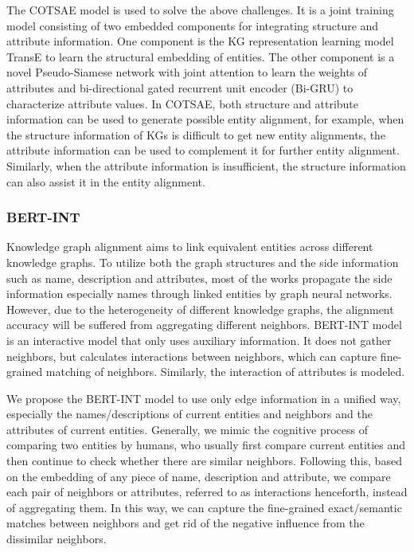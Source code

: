 \documentclass[sigconf]{acmart}
\begin{document}
{The COTSAE model is used to solve the above challenges. It is a joint training model consisting of two embedded components for integrating structure and attribute information. One component is the KG representation learning model TransE to learn the structural embedding of entities. The other component is a novel Pseudo-Siamese network with joint attention to learn the weights of attributes and bi-directional gated recurrent unit encoder (Bi-GRU) to characterize attribute values. In COTSAE, both structure and attribute information can be used to generate possible entity alignment, for example, when the structure information of KGs is difficult to get new entity alignments, the attribute information can be used to complement it for further entity alignment. Similarly, when the attribute information is insufficient, the structure information can also assist it in the entity alignment. 

\subsubsection{BERT-INT \cite{tang2020bert}}

Knowledge graph alignment aims to link equivalent entities across different knowledge graphs. To utilize both the graph structures and the side information such as name, description and attributes, most of the works propagate the side information especially names through linked entities by graph neural networks. However, due to the heterogeneity of different knowledge graphs, the alignment accuracy will be suffered from aggregating different neighbors. BERT-INT model is an interactive model that only uses auxiliary information. It does not gather neighbors, but calculates interactions between neighbors, which can capture fine-grained matching of neighbors. Similarly, the interaction of attributes is modeled.

We propose the BERT-INT model to use only edge information in a unified way, especially the names/descriptions of current entities and neighbors and the attributes of current entities. Generally, we mimic the cognitive process of comparing two entities by humans, who usually first compare current entities and then continue to check whether there are similar neighbors. Following this, based on the embedding of any piece of name, description and attribute, we compare each pair of neighbors or attributes, referred to as interactions henceforth, instead of aggregating them. In this way, we can capture the fine-grained exact/semantic matches between neighbors and get rid of the negative influence from the dissimilar neighbors.

}
\end{document}
